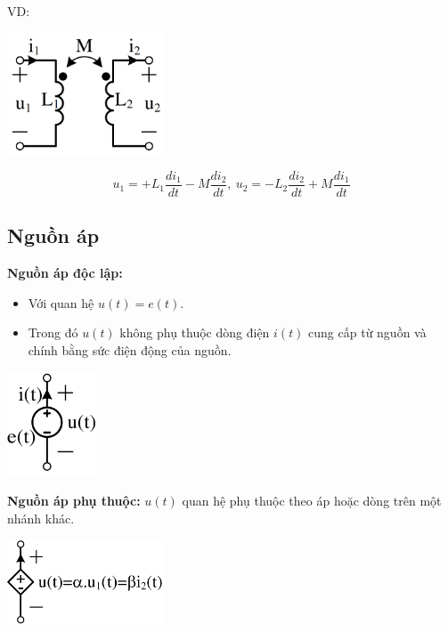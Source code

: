 VD:
\begin{center}
  \includegraphics[width=0.35\textwidth]{./image/8.png}
\end{center}
\[
  u_1 = +L_1\dfrac{di_1}{dt}- M\dfrac{di_2}{dt},\ u_2 = - L_2\dfrac{di_2}{dt}+ M\dfrac{di_1}{dt}
\]
\subsection{Nguồn áp}
\textbf{Nguồn áp độc lập:}
\begin{itemize}
  \item Với quan hệ $u(t) = e(t)$. 
  \item Trong đó $u(t)$ không phụ thuộc dòng điện $i(t)$ cung cấp từ nguồn và chính bằng sức điện động của nguồn.
\end{itemize}
\begin{center}
  \includegraphics[width=0.2\textwidth]{./image/9.png}
\end{center}
\textbf{Nguồn áp phụ thuộc:} $u(t)$ quan hệ phụ thuộc theo áp hoặc dòng trên một nhánh khác.
\begin{center}
  \includegraphics[width=0.35\textwidth]{./image/10.png}
\end{center}

